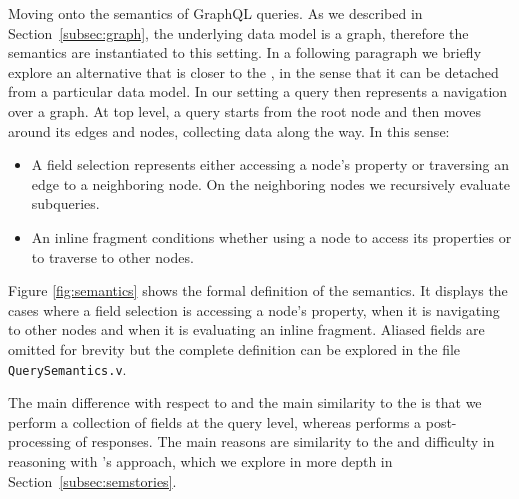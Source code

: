 Moving onto the semantics of GraphQL queries. As we described in Section~\ref{subsec:graph}, the underlying data model is a graph, therefore the semantics are instantiated to this setting. In a following paragraph we briefly explore an alternative that is closer to the \spec{}, in the sense that it can be detached from a particular data model. In our setting a query then represents a navigation over a graph. At top level, a query starts from the root node and then moves around its edges and nodes, collecting data along the way. In this sense:
\begin{itemize}
    \item A field selection represents either accessing a node's property or traversing an edge to a neighboring node. On the neighboring nodes we recursively evaluate subqueries.
    \item An inline fragment conditions whether using a node to access its properties or to traverse to other nodes.
\end{itemize}

Figure \ref{fig:semantics} shows the formal definition of the semantics. It displays the cases where a field selection is accessing a node's property, when it is navigating to other nodes and when it is evaluating an inline fragment. Aliased fields are omitted for brevity but the complete definition can be explored in the file \texttt{QuerySemantics.v}.

The main difference with respect to \HP{} and the main similarity to the \spec{} is that we perform a collection of fields at the query level, whereas \HP{} performs a post-processing of responses. The main reasons are similarity to the \spec{} and difficulty in reasoning with \HP{}'s approach, which we explore in more depth in Section~\ref{subsec:semstories}.


